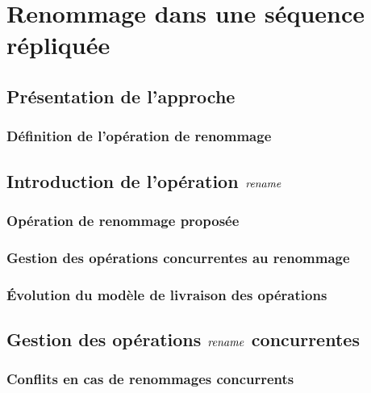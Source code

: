 \NumberThisInToc
\chapter{Renommage dans une séquence répliquée}
\minitoc
\label{chap:renamablelogootsplit}

\section{Présentation de l'approche}


\subsection{Définition de l'opération de renommage}


\section{Introduction de l'opération $\mathit{rename}$}
\label{sec:centralised-rls}

\subsection{Opération de renommage proposée}


\subsection{Gestion des opérations concurrentes au renommage}


\subsection{Évolution du modèle de livraison des opérations}


\section{Gestion des opérations $\mathit{rename}$ concurrentes}
\label{sec:distributed-rls}

\subsection{Conflits en cas de renommages concurrents}


